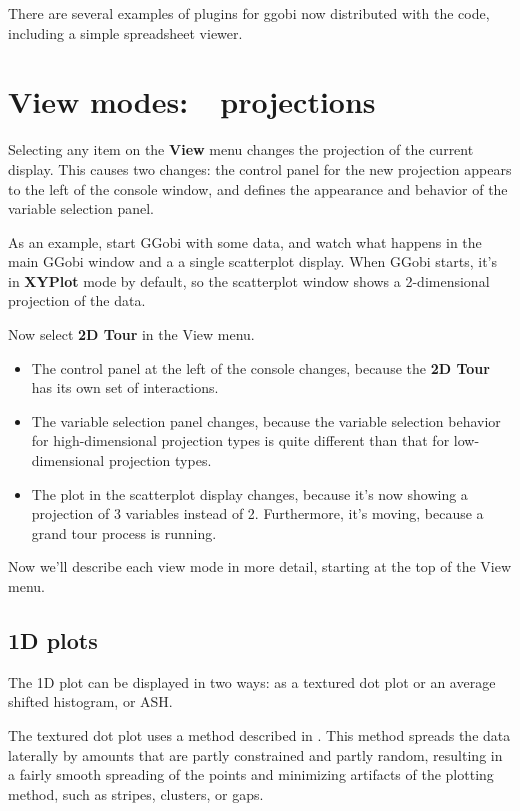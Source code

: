 \documentclass[11pt]{article}
\def\Widget#1{\textbf{#1}}
\begin{document}
There are several examples of plugins for ggobi now distributed with
the code, including a simple spreadsheet viewer.

\section{View modes:~~projections}
\label{slbl:ViewModes}

Selecting any item on the \Widget{View} menu changes the projection of
the current display.  This causes two changes: the control panel for
the new projection appears to the left of the console window, and
defines the appearance and behavior of the variable selection panel.

As an example, start GGobi with some data, and watch what happens in
the main GGobi window and a a single scatterplot display.   When
GGobi starts, it's in \Widget{XYPlot} mode by default, so the
scatterplot window shows a 2-dimensional projection of the data. 

Now select \Widget{2D Tour} in the View menu.  

\begin{itemize}
\itemsep 0em
\item The control panel at the left of the console changes, because
      the \Widget{2D Tour} has its own set of interactions.
\item The variable selection panel changes, because the variable
      selection behavior for high-dimensional projection types is
      quite different than that for low-dimensional projection types.
\item The plot in the scatterplot display changes, because it's
      now showing a projection of 3 variables instead of 2.  Furthermore,
      it's moving, because a grand tour process is running.
\end{itemize}


Now we'll describe each view mode in more detail, starting at the
top of the View menu. 

\subsection{1D plots}

The 1D plot can be displayed in two ways:  as a textured dot plot
or an average shifted histogram, or ASH.

The textured dot plot uses a method described in \cite{TukeyTukey90}.
This method spreads the data laterally by amounts that are partly
constrained and partly random, resulting in a fairly smooth spreading
of the points and minimizing artifacts of the plotting method, such as
stripes, clusters, or gaps.
\end{document}
